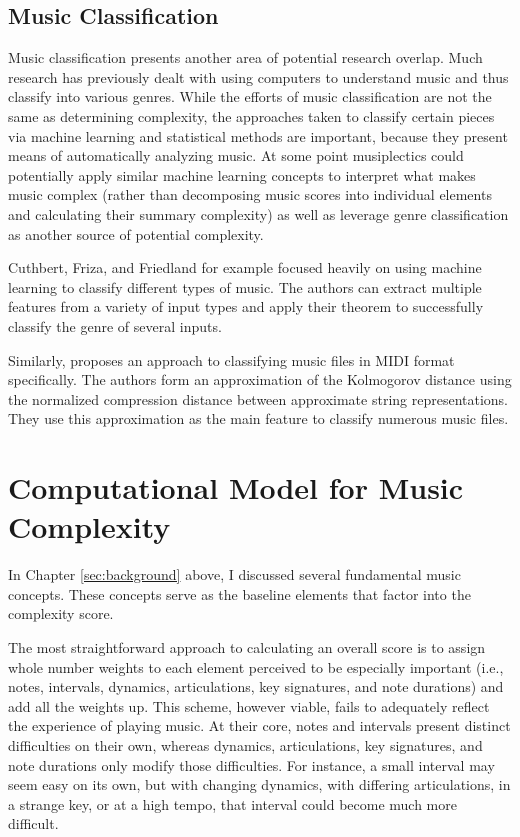 \documentclass[12pt]{report}
\begin{document}
\section{Music Classification}
\label{sec:relclass}

Music classification presents another area of potential research overlap. Much research has previously dealt with using computers to understand music and thus classify into various genres. While the efforts of music classification are not the same as determining complexity, the approaches taken to classify certain pieces via machine learning and statistical methods are important, because they present means of automatically analyzing music. At some point musiplectics could potentially apply similar machine learning concepts to interpret what makes music complex (rather than decomposing music scores into individual elements and calculating their summary complexity) as well as leverage genre classification as another source of potential complexity.

Cuthbert, Friza, and Friedland \cite{Cuthbert2011} for example focused heavily on using machine learning to classify different types of music. The authors can extract multiple features from a variety of input types and apply their theorem to successfully classify the genre of several inputs.

Similarly, \cite{Cataltepe2007} proposes an approach to classifying music files in MIDI format specifically. The authors form an approximation of the Kolmogorov distance using the normalized compression distance between approximate string representations. They use this approximation as the main feature to classify numerous music files.

\chapter{Computational Model for Music Complexity} 
\label{sec:scoring}

In Chapter \ref{sec:background} above, I discussed several fundamental music concepts. These concepts serve as the baseline elements that factor into the complexity score. 

The most straightforward approach to calculating an overall score is to assign whole number weights to each element perceived to be especially important (i.e., notes, intervals, dynamics, articulations, key signatures, and note durations) and add all the weights up. This scheme, however viable, fails to adequately reflect the experience of playing music. At their core, notes and intervals present distinct difficulties on their own, whereas dynamics, articulations, key signatures, and note durations only modify those difficulties. For instance, a small interval may seem easy on its own, but with changing dynamics, with differing articulations, in a strange key, or at a high tempo, that interval could become much more difficult.
\end{document}
